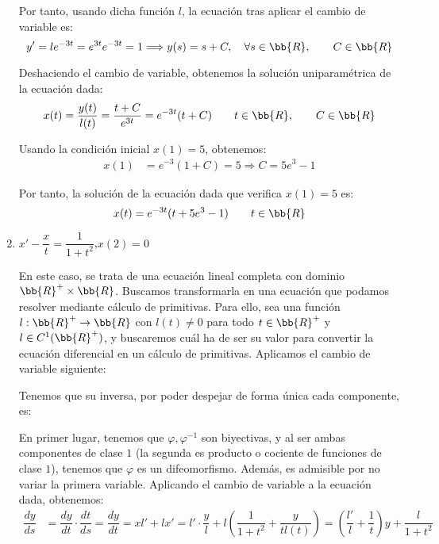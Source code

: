 \begin{ejercicio}
\begin{enumerate}
        Por tanto, usando dicha función $l$, la ecuación tras aplicar el cambio de variable es:
        \begin{equation*}
            y' = le^{-3t} = e^{3t}e^{-3t} = 1 \Longrightarrow y(s) = s + C,\quad \forall s\in \bb{R}, \qquad C\in \bb{R}
        \end{equation*}

        Deshaciendo el cambio de variable, obtenemos la solución uniparamétrica de la ecuación dada:
        \begin{equation*}
            x(t) = \dfrac{y(t)}{l(t)} = \dfrac{t+C}{e^{3t}} = e^{-3t}(t+C) \qquad t\in \bb{R}, \qquad C\in \bb{R}
        \end{equation*}

        Usando la condición inicial $x(1)=5$, obtenemos:
        \begin{align*}
            x(1) &= e^{-3}(1+C) = 5 \Longrightarrow C=5e^3-1
        \end{align*}

        Por tanto, la solución de la ecuación dada que verifica $x(1)=5$ es:
        \begin{equation*}
            x(t) = e^{-3t}(t+5e^3-1) \qquad t\in \bb{R}
        \end{equation*}

        \item $x' - \dfrac{x}{t} = \dfrac{1}{1+t^2}$,\qquad $x(2) = 0$
        
        En este caso, se trata de una ecuación lineal completa con dominio $\bb{R}^+\times \bb{R}$.
        Buscamos transformarla en una ecuación que podamos resolver mediante cálculo de primitivas.
        Para ello, sea una función $l:\bb{R}^+\to \bb{R}$ con $l(t)\neq 0$ para todo $t\in \bb{R}^+$ y $l\in C^1(\bb{R}^+)$, y buscaremos cuál ha de ser su valor para convertir la ecuación diferencial en un cálculo de primitivas.
        Aplicamos el cambio de variable siguiente:

        Tenemos que su inversa, por poder despejar de forma única cada componente, es:

        En primer lugar, tenemos que $\varphi,\varphi^{-1}$ son biyectivas, y al ser ambas componentes de clase $1$ (la segunda es producto o cociente de funciones de clase $1$), tenemos que $\varphi$ es un difeomorfismo. Además, es admisible por no variar la primera variable.
        Aplicando el cambio de variable a la ecuación dada, obtenemos:
        \begin{align*}
            \dfrac{dy}{ds} &= \dfrac{dy}{dt}\cdot \dfrac{dt}{ds} = \dfrac{dy}{dt} = xl' + lx' = l'\cdot \dfrac{y}{l} + l\left(\dfrac{1}{1+t^2} +\dfrac{y}{tl(t)}\right)
            = \left(\dfrac{l'}{l} +\dfrac{1}{t}\right)y + \dfrac{l}{1+t^2}
        \end{align*}


\end{enumerate}
\end{ejercicio}
